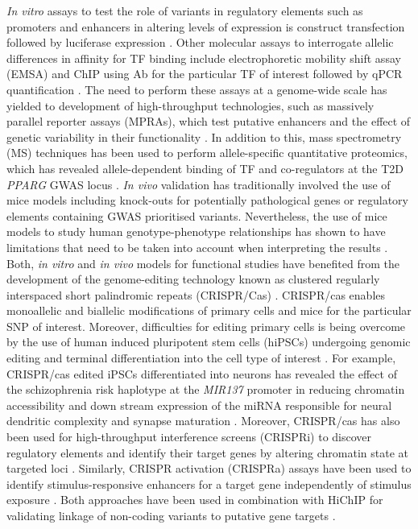 \textit{In vitro} assays to test the role of variants in regulatory elements such as promoters and enhancers in altering levels of expression is construct transfection followed by luciferase expression \parencite{Niimi2002}. Other molecular assays to interrogate allelic differences in affinity for TF binding include electrophoretic mobility shift assay (EMSA) and ChIP using Ab for the particular TF of interest followed by qPCR quantification \parencite{Vernes2007}. The need to perform these assays at a genome-wide scale has yielded to development of high-throughput technologies, such as massively parallel reporter assays (MPRAs), which test putative enhancers and the effect of genetic variability in their functionality \parencite{Kheradpour2013}. In addition to this, mass spectrometry (MS) techniques has been used to perform allele-specific quantitative proteomics, which has revealed allele-dependent binding of TF and co-regulators at the T2D \textit{PPARG} GWAS locus \parencite{Lee2017}. \textit{In vivo} validation has traditionally involved the use of mice models including knock-outs for potentially pathological genes or regulatory elements containing GWAS prioritised variants. Nevertheless, the use of mice models to study human genotype-phenotype relationships has shown to have limitations that need to be taken into account when interpreting the results \parencite{Ermann2012}. Both, \textit{in vitro} and \textit{in vivo} models for functional studies have benefited from the development of the genome-editing technology known as clustered regularly interspaced short palindromic repeats (CRISPR/Cas) \parencite{Cong2013}. CRISPR/cas enables monoallelic and biallelic modifications of primary cells and mice for the particular SNP of interest. Moreover, difficulties for editing primary cells is being overcome by the use of human induced pluripotent stem cells (hiPSCs) undergoing genomic editing and terminal differentiation into the cell type of interest \parencite{Ding2013}. For example, CRISPR/cas edited iPSCs differentiated into neurons has revealed the effect of the schizophrenia risk haplotype at the \textit{MIR137} promoter in reducing chromatin accessibility and down stream expression of the miRNA responsible for neural dendritic complexity and synapse maturation \parencite{Forrest2017}. Moreover, CRISPR/cas has also been used for high-throughput interference screens (CRISPRi) to discover regulatory elements and identify their target genes by altering chromatin state at targeted loci . Similarly, CRISPR activation (CRISPRa) assays have been used to identify stimulus-responsive enhancers for a target gene independently of stimulus exposure \parencite{Simeonov2017}. Both approaches have been used in combination with HiChIP for validating linkage of non-coding variants to putative gene targets \parencite{Mumbach2017}.


